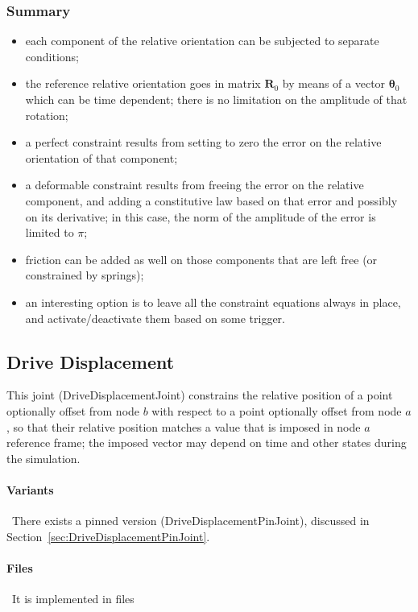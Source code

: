 \documentclass[10pt,dvips,fleqn]{report}
\newcommand{\T}[1]{\boldsymbol{#1}}
\begin{document}
\subsubsection{Summary}
\begin{itemize}
\item each component of the relative orientation can be subjected
to separate conditions;
\item the reference relative orientation goes in matrix $\T{R}_0$
by means of a vector $\T{\theta}_0$ which can be time dependent;
there is no limitation on the amplitude of that rotation;
\item a perfect constraint results from setting to zero the error
on the relative orientation of that component;
\item a deformable constraint results from freeing the error
on the relative component, and adding a constitutive law
based on that error and possibly on its derivative;
in this case, the norm of the amplitude of the error is limited
to $\pi$;
\item friction can be added as well on those components
that are left free (or constrained by springs);
\item an interesting option is to leave all the constraint equations
always in place, and activate/deactivate them based on some trigger.
\end{itemize}





\subsection{Drive Displacement}
\label{sec:DriveDisplacementJoint}
This joint (DriveDisplacementJoint) constrains the relative position
of a point optionally offset from node $b$ with respect to a point
optionally offset from node $a$, so that their relative position matches
a value that is imposed in node $a$ reference frame; the imposed vector
may depend on time and other states during the simulation.

\paragraph{Variants} \
There exists a pinned version (DriveDisplacementPinJoint),
discussed in Section~\ref{sec:DriveDisplacementPinJoint}.

\paragraph{Files} \
It is implemented in files
\end{document}

